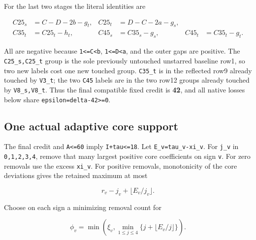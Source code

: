 \documentclass[10pt,a4paper]{article}
\theoremstyle{definition}
\begin{document}
For the last two stages the literal identities are

\[
 \begin{aligned}
 C25_s&=\allowbreak{}C-D-2b-g_t,\allowbreak{}&C25_t&=\allowbreak{}D-C-2a-g_s,\allowbreak{}\\
 C35_t&=\allowbreak{}C25_t-h_t,\allowbreak{}&C45_s&=\allowbreak{}C35_s-g_s,\allowbreak{}&C45_t&=\allowbreak{}C35_t-g_t.
 \end{aligned}
\]

All are negative because \texttt{1<=\allowbreak{}C<b},\allowbreak{}
\texttt{1<=\allowbreak{}D<a},\allowbreak{} and the outer gaps are positive. The
\texttt{C25\_\allowbreak{}\allowbreak{}s,\allowbreak{}C25\_\allowbreak{}\allowbreak{}t} group is the sole previously
untouched unstarred baseline row1,\allowbreak{} so two new labels cost one new
touched group. \texttt{C35\_\allowbreak{}\allowbreak{}t} is in the reflected row9
already touched by \texttt{V3\_\allowbreak{}\allowbreak{}t}; the two
\texttt{C45} labels are in the two row12 groups already
touched by \texttt{V8\_\allowbreak{}\allowbreak{}s,\allowbreak{}V8\_\allowbreak{}\allowbreak{}t}. Thus the final
compatible fixed credit is \textbf{42},\allowbreak{} and all native losses below
share \texttt{epsilon=\allowbreak{}delta-42>=\allowbreak{}0}.

\hypertarget{one-actual-adaptive-core-support}{%
\subsection{One actual adaptive core
support}\label{one-actual-adaptive-core-support}}

The final credit and \texttt{A<=\allowbreak{}60} imply
\texttt{I+\allowbreak{}tau<=\allowbreak{}18}. Let
\texttt{E\_\allowbreak{}\allowbreak{}v=\allowbreak{}tau\_\allowbreak{}\allowbreak{}v-xi\_\allowbreak{}\allowbreak{}v}. For
\texttt{j\_\allowbreak{}\allowbreak{}v} in \texttt{0,\allowbreak{}1,\allowbreak{}2,\allowbreak{}3,\allowbreak{}4},\allowbreak{}
remove that many largest positive core coefficients on sign
\texttt{v}. For zero removals use the excess
\texttt{xi\_\allowbreak{}\allowbreak{}v}. For positive removals,\allowbreak{} monotonicity of
the core deviations gives the retained maximum at most

\[
 r_v-j_v+\allowbreak{}\lfloor E_v/j_v\rfloor.
\]

Choose on each sign a minimizing removal count for

\[
 \phi_v=\allowbreak{}\min\left(\xi_v,\allowbreak{}
       \min_{1\le j\le4}\{j+\allowbreak{}\lfloor E_v/j\rfloor\}\right).
\]
\end{document}
